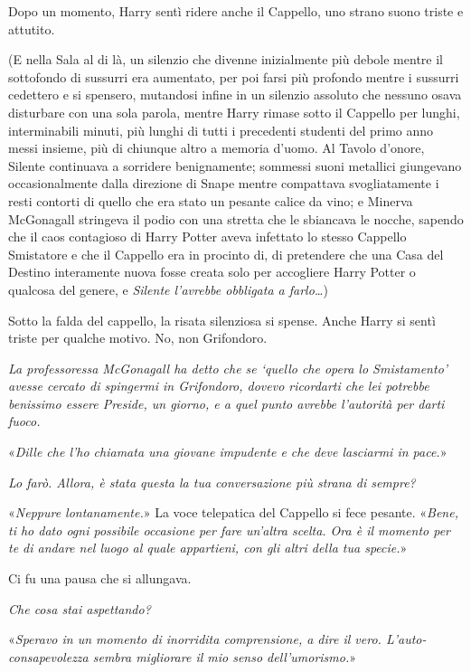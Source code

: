 Dopo un momento, Harry sentì ridere anche il Cappello, uno strano suono triste e attutito.

(E nella Sala al di là, un silenzio che divenne inizialmente più debole mentre il sottofondo di sussurri era aumentato, per poi farsi più profondo mentre i sussurri cedettero e si spensero, mutandosi infine in un silenzio assoluto che nessuno osava disturbare con una sola parola, mentre Harry rimase sotto il Cappello per lunghi, interminabili minuti, più lunghi di tutti i precedenti studenti del primo anno messi insieme, più di chiunque altro a memoria d’uomo. Al Tavolo d’onore, Silente continuava a sorridere benignamente; sommessi suoni metallici giungevano occasionalmente dalla direzione di Snape mentre compattava svogliatamente i resti contorti di quello che era stato un pesante calice da vino; e Minerva McGonagall stringeva il podio con una stretta che le sbiancava le nocche, sapendo che il caos contagioso di Harry Potter aveva infettato lo stesso Cappello Smistatore e che il Cappello era in procinto di, di pretendere che una Casa del Destino interamente nuova fosse creata solo per accogliere Harry Potter o qualcosa del genere, e \textit{Silente l’avrebbe obbligata a farlo…})

Sotto la falda del cappello, la risata silenziosa si spense. Anche Harry si sentì triste per qualche motivo. No, non Grifondoro.

\textit{La professoressa McGonagall ha detto che se ‘quello che opera lo Smistamento’ avesse cercato di spingermi in Grifondoro, dovevo ricordarti che lei potrebbe benissimo essere Preside, un giorno, e a quel punto avrebbe l’autorità per darti fuoco.}

«\textit{Dille che l’ho chiamata una giovane impudente e che deve lasciarmi in pace.}»

\textit{Lo farò. Allora, è stata questa la tua conversazione più strana di sempre?}

«\textit{Neppure lontanamente.}» La voce telepatica del Cappello si fece pesante. «\textit{Bene, ti ho dato ogni possibile occasione per fare un’altra scelta. Ora è il momento per te di andare nel luogo al quale appartieni, con gli altri della tua specie.}»

Ci fu una pausa che si allungava.

\textit{Che cosa stai aspettando?}

«\textit{Speravo in un momento di inorridita comprensione, a dire il vero. L’auto-consapevolezza sembra migliorare il mio senso dell’umorismo.}»

